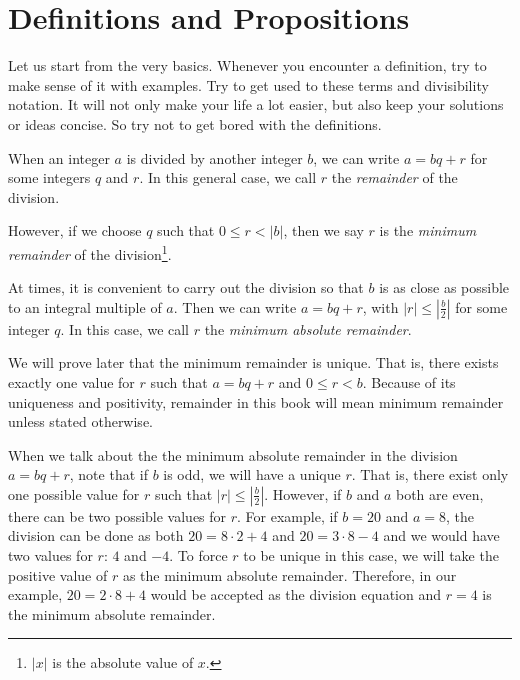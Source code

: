 \documentclass{subfile}
\begin{document}
	\section{Definitions and Propositions}
	Let us start from the very basics. Whenever you encounter a definition, try to make sense of it with examples. Try to get used to these terms and divisibility notation. It will not only make your life a lot easier, but also keep your solutions or ideas concise. So try not to get bored with the definitions.
	\begin{definition}\label{def:remainder}
		When an integer $a$ is divided by another integer $b$, we can write $a=bq+r$ for some integers $q$ and $r$. In this general case, we call $r$ the \textit{remainder} of the division.

		However, if we choose $q$ such that $0\leq r< |b|$, then we say $r$ is the \textit{minimum remainder} of the division\footnote{$|x|$ is the absolute value of $x$.}.

		At times, it is convenient to carry out the division so that $b$ is as close as possible to an integral multiple of $a$. Then we can write $a = bq + r$, with $|r| \leq |\frac{b}{2}|$ for some integer $q$.  In this case, we call $r$ the \textit{minimum absolute remainder}.
	\end{definition}

	\begin{note}[1]
		We will prove later that the minimum remainder is unique. That is, there exists exactly one value for $r$ such that $a=bq+r$ and $0 \leq r <b$. Because of its uniqueness and positivity, remainder in this book will mean minimum remainder unless stated otherwise.
	\end{note}

	\begin{note}[2]
		When we talk about the the minimum absolute remainder in the division $a=bq+r$, note that if $b$ is odd, we will have a unique $r$. That is, there exist only one possible value for $r$ such that $|r| \leq |\frac{b}{2}|$. However, if $b$ and $a$ both are even, there can be two possible values for $r$. For example, if $b=20$ and $a=8$, the division can be done as both $20=8\cdot2+4$ and $20=3\cdot8-4$ and we would have two values for $r$: $4$ and $-4$. To force $r$ to be unique in this case, we will take the positive value of $r$ as the minimum absolute remainder. Therefore, in our example, $20=2\cdot8+4$ would be accepted as the division equation and $r=4$ is the minimum absolute remainder.
	\end{note}
\end{document}
